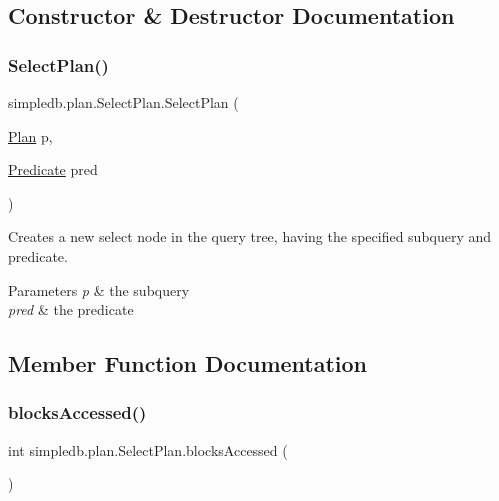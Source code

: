 \subsection{Constructor \& Destructor Documentation}
\mbox{\label{classsimpledb_1_1plan_1_1SelectPlan_a9a68f7746d59d465befeda13b3f759fc}} 
\subsubsection{\texorpdfstring{Select\+Plan()}{SelectPlan()}}
{\footnotesize\ttfamily simpledb.\+plan.\+Select\+Plan.\+Select\+Plan (\begin{DoxyParamCaption}\item[{\hyperlink{interfacesimpledb_1_1plan_1_1Plan}{Plan}}]{p,  }\item[{\hyperlink{classsimpledb_1_1query_1_1Predicate}{Predicate}}]{pred }\end{DoxyParamCaption})\hspace{0.3cm}{\ttfamily [inline]}}

Creates a new select node in the query tree, having the specified subquery and predicate. 
\begin{DoxyParams}{Parameters}
{\em p} & the subquery \\
\hline
{\em pred} & the predicate \\
\hline
\end{DoxyParams}


\subsection{Member Function Documentation}
\mbox{\label{classsimpledb_1_1plan_1_1SelectPlan_aac8710bb3dcdab26ccd276ccb19f95cb}} 
\subsubsection{\texorpdfstring{blocks\+Accessed()}{blocksAccessed()}}
{\footnotesize\ttfamily int simpledb.\+plan.\+Select\+Plan.\+blocks\+Accessed (\begin{DoxyParamCaption}{ }\end{DoxyParamCaption})\hspace{0.3cm}{\ttfamily [inline]}}

